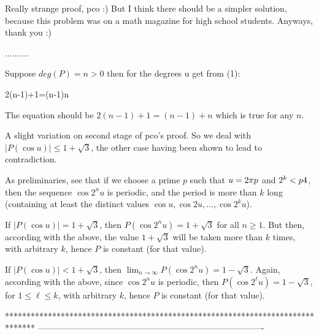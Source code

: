 \begin{solution}
	Really strange proof, pco :) 
But I think there should be a simpler solution, because this problem was on a math magazine for high school students.
Anyways, thank you :)
\end{solution}



\begin{solution}
	..........
\end{solution}



\begin{solution}
	\begin{tcolorbox}Suppose $deg(P)=n>0$ then for the degrees u get from (1):

2(n-1)+1=(n-1)n \end{tcolorbox}

The equation should be $2(n-1) + 1 = (n-1) + n$ which is true for any $n$.
\end{solution}



\begin{solution}
	A slight variation on second stage of pco's proof. So we deal with $|P(\cos u)| \leq 1+\sqrt{3}$, the other case having been shown to lead to contradiction.

As preliminaries, see that if we choose a prime $p$ such that $u = 2\pi\/p$ and $2^k < p\/4$, then the sequence $\cos 2^n
u$ is periodic, and the period is more than $k$ long (containing at least the distinct values $\cos u, \cos 2u, \ldots, \cos 2^k u$).

If $|P(\cos u)| = 1+\sqrt{3}$, then $P(\cos 2^n u) = 1+\sqrt{3}$ for all $n\geq 1$. But then, according with the above, the value $1+\sqrt{3}$ will be taken more than $k$ times, with arbitrary $k$, hence $P$ is constant (for that value).

If $|P(\cos u)| < 1+\sqrt{3}$, then $\lim_{n\to \infty} P(\cos 2^n u) = 1-\sqrt{3}$. Again, according with the above, since $\cos 2^n u$ is periodic, then $P(\cos 2^{\ell} u) = 1-\sqrt{3}$, for $1\leq \ell \leq k$, with arbitrary $k$, hence $P$ is constant (for that value).
\end{solution}
*******************************************************************************
-------------------------------------------------------------------------------

